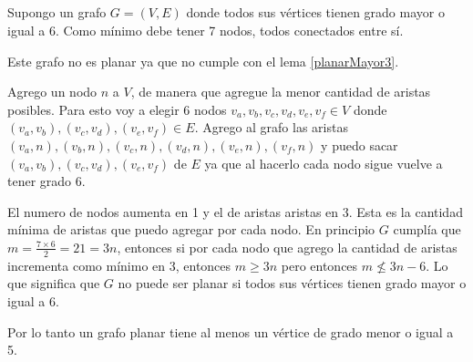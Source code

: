 \subsection{}

\subsubsection{}
Supongo un grafo $G = (V, E)$ donde todos sus vértices tienen grado mayor o igual a 6. Como mínimo debe tener 7 nodos, todos conectados entre sí. 

Este grafo no es planar ya que no cumple con el lema \ref{planarMayor3}.

Agrego un nodo $n$ a $V$, de manera que agregue la menor cantidad de aristas posibles. Para esto voy a elegir 6 nodos $v_a, v_b, v_c, v_d, v_e, v_f \in V$ donde $(v_a, v_b), (v_c, v_d), (v_e, v_f) \in E$. Agrego al grafo las aristas $(v_a, n), (v_b, n), (v_c, n), (v_d, n), (v_e, n), (v_f, n)$ y puedo sacar $(v_a, v_b), (v_c, v_d), (v_e, v_f)$ de $E$ ya que al hacerlo cada nodo sigue vuelve a tener grado 6.

El numero de nodos aumenta en 1 y el de aristas aristas en 3. Esta es la cantidad mínima de aristas que puedo agregar por cada nodo. En principio $G$ cumplía que $m = \frac{7 \times 6}{2} = 21 = 3n$, entonces si por cada nodo que agrego la cantidad de aristas incrementa como mínimo en 3, entonces $m \geq 3n$ pero entonces $m \not \leq 3n - 6$. Lo que significa que $G$ no puede ser planar si todos sus vértices tienen grado mayor o igual a 6.

Por lo tanto un grafo planar tiene al menos un vértice de grado menor o igual a 5.